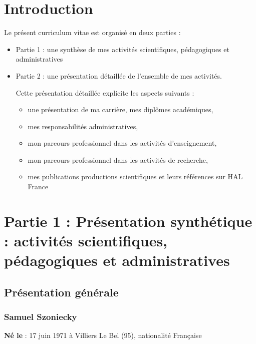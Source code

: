 \documentclass[
  a4paper,
  DIV=11,
  numbers=noendperiod]{scrreprt}
\begin{document}
\chapter*{Introduction}\label{introduction}

Le présent curriculum vitae est organisé en deux parties :

\begin{itemize}
\item
  Partie 1 : une synthèse de mes activités scientifiques, pédagogiques
  et administratives
\item
  Partie 2 : une présentation détaillée de l'ensemble de mes activités.

  Cette présentation détaillée explicite les aspects suivants :

  \begin{itemize}
  \item
    une présentation de ma carrière, mes diplômes académiques,
  \item
    mes responsabilités administratives,
  \item
    mon parcours professionnel dans les activités d'enseignement,
  \item
    mon parcours professionnel dans les activités de recherche,
  \item
    mes publications productions scientifiques et leurs références sur
    HAL France
  \end{itemize}
\end{itemize}

\chapter{Partie 1 : Présentation synthétique : activités scientifiques,
pédagogiques et administratives}\label{sec-CVpartie1}

\section{Présentation générale}\label{pruxe9sentation-guxe9nuxe9rale}

\subsection*{\texorpdfstring{\textbf{Samuel
Szoniecky}}{Samuel Szoniecky}}\label{samuel-szoniecky}

\textbf{Né le} : 17 juin 1971 à Villiers Le Bel (95), nationalité
Française
\end{document}
